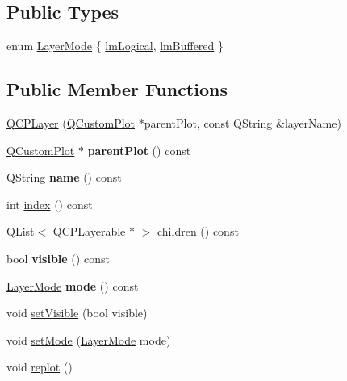 \subsection*{Public Types}
\begin{DoxyCompactItemize}
\item 
enum \hyperlink{classQCPLayer_a67dcfc1590be2a1f2227c5a39bb59c7c}{Layer\+Mode} \{ \hyperlink{classQCPLayer_a67dcfc1590be2a1f2227c5a39bb59c7ca02eb5e9a4cb7f1baf1e2b6b99e3b87ce}{lm\+Logical}, 
\hyperlink{classQCPLayer_a67dcfc1590be2a1f2227c5a39bb59c7cab581b9fab3007c4c65f057f4185d7538}{lm\+Buffered}
 \}
\end{DoxyCompactItemize}
\subsection*{Public Member Functions}
\begin{DoxyCompactItemize}
\item 
\hyperlink{classQCPLayer_a5d0657fc86d624e5efbe930ef21af718}{Q\+C\+P\+Layer} (\hyperlink{classQCustomPlot}{Q\+Custom\+Plot} $\ast$parent\+Plot, const Q\+String \&layer\+Name)
\item 
\mbox{\label{classQCPLayer_a5520019787482e13857ebe631c27c3fa}} 
\hyperlink{classQCustomPlot}{Q\+Custom\+Plot} $\ast$ {\bfseries parent\+Plot} () const
\item 
\mbox{\label{classQCPLayer_a37806f662b50b588fb1029a14fc5ef50}} 
Q\+String {\bfseries name} () const
\item 
int \hyperlink{classQCPLayer_ad322905c4700dcc7ceba63e011c730d2}{index} () const
\item 
Q\+List$<$ \hyperlink{classQCPLayerable}{Q\+C\+P\+Layerable} $\ast$ $>$ \hyperlink{classQCPLayer_a183b90941fc78f0b136edd77c5fb6966}{children} () const
\item 
\mbox{\label{classQCPLayer_ad1cc2d6b32d2abb33c7f449b964e068c}} 
bool {\bfseries visible} () const
\item 
\mbox{\label{classQCPLayer_a44ae50b011b19f3dd46a38d8e2e2c1b6}} 
\hyperlink{classQCPLayer_a67dcfc1590be2a1f2227c5a39bb59c7c}{Layer\+Mode} {\bfseries mode} () const
\item 
void \hyperlink{classQCPLayer_ac07671f74edf6884b51a82afb2c19516}{set\+Visible} (bool visible)
\item 
void \hyperlink{classQCPLayer_a938d57b04f4e4c23cedf1711f983919b}{set\+Mode} (\hyperlink{classQCPLayer_a67dcfc1590be2a1f2227c5a39bb59c7c}{Layer\+Mode} mode)
\item 
void \hyperlink{classQCPLayer_adefd53b6db02f470151c416f42e37180}{replot} ()
\end{DoxyCompactItemize}
